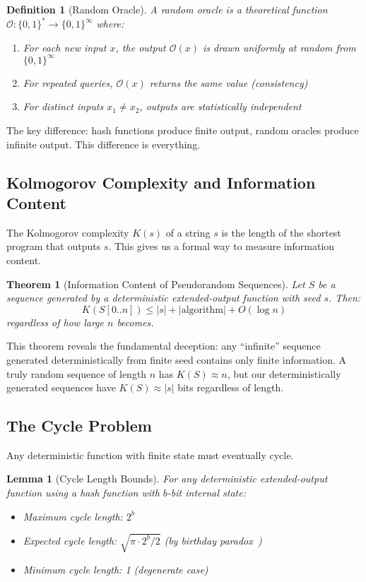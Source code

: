 \documentclass[11pt]{article}
\newtheorem{definition}{Definition}
\newtheorem{theorem}{Theorem}
\newtheorem{lemma}{Lemma}
\begin{document}
\begin{definition}[Random Oracle]
A random oracle is a theoretical function $\mathcal{O}: \{0,1\}^* \to \{0,1\}^\infty$ where:
\begin{enumerate}
\item For each new input $x$, the output $\mathcal{O}(x)$ is drawn uniformly at random from $\{0,1\}^\infty$
\item For repeated queries, $\mathcal{O}(x)$ returns the same value (consistency)
\item For distinct inputs $x_1 \neq x_2$, outputs are statistically independent
\end{enumerate}
\end{definition}

The key difference: hash functions produce finite output, random oracles produce infinite output. This difference is everything.

\subsection{Kolmogorov Complexity and Information Content}

The Kolmogorov complexity $K(s)$ of a string $s$ is the length of the shortest program that outputs $s$. This gives us a formal way to measure information content.

\begin{theorem}[Information Content of Pseudorandom Sequences]
Let $S$ be a sequence generated by a deterministic extended-output function with seed $s$. Then:
$$K(S[0..n]) \leq |s| + |\text{algorithm}| + O(\log n)$$
regardless of how large $n$ becomes.
\end{theorem}

This theorem reveals the fundamental deception: any ``infinite'' sequence generated deterministically from finite seed contains only finite information. A truly random sequence of length $n$ has $K(S) \approx n$, but our deterministically generated sequences have $K(S) \approx |s|$ bits regardless of length.

\subsection{The Cycle Problem}

Any deterministic function with finite state must eventually cycle.

\begin{lemma}[Cycle Length Bounds]
For any deterministic extended-output function using a hash function with $b$-bit internal state:
\begin{itemize}
\item Maximum cycle length: $2^b$
\item Expected cycle length: $\sqrt{\pi \cdot 2^b / 2}$ (by birthday paradox~\cite{katz2014introduction})
\item Minimum cycle length: 1 (degenerate case)
\end{itemize}
\end{lemma}
\end{document}
